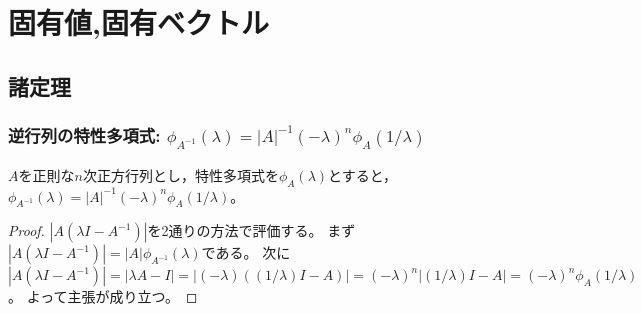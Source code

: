 \chapter{固有値,固有ベクトル}
    \section{諸定理}
        \subsection{逆行列の特性多項式: \texorpdfstring{$\phi_{A^{-1}}(\lambda) = |A|^{-1}(-\lambda)^n\phi_A(1/\lambda)$}{φA\string^(-1)(λ) = |A|\string^(-1)\string^n φA(1/λ)}}
            \begin{shadebox}
                $A$を正則な$n$次正方行列とし，特性多項式を$\phi_A(\lambda)$とすると，$\phi_{A^{-1}}(\lambda) = |A|^{-1}(-\lambda)^n\phi_A(1/\lambda)$。
            \end{shadebox}
            \begin{proof}
                \quad\par
                $|A(\lambda I - A^{-1})|$を2通りの方法で評価する。
                まず$|A(\lambda I - A^{-1})| = |A|\phi_{A^{-1}}(\lambda)$である。
                次に$|A(\lambda I - A^{-1})| = |\lambda A - I| = |(-\lambda)((1/\lambda)I - A)| = (-\lambda)^n|(1/\lambda)I - A| = (-\lambda)^n\phi_A(1/\lambda)$。
                よって主張が成り立つ。
            \end{proof}

